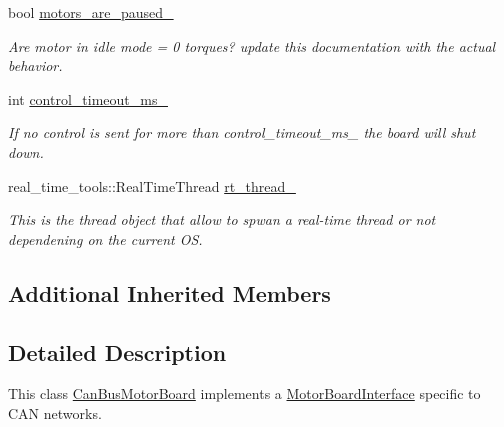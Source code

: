 \begin{DoxyCompactItemize}
\mbox{\label{classblmc__drivers_1_1CanBusMotorBoard_abdca3f76908ca197c4f12af814313a56}} 
bool \hyperlink{classblmc__drivers_1_1CanBusMotorBoard_abdca3f76908ca197c4f12af814313a56}{motors\+\_\+are\+\_\+paused\+\_\+}
\begin{DoxyCompactList}\small\item\em Are motor in idle mode = 0 torques?  update this documentation with the actual behavior. \end{DoxyCompactList}\item 
\mbox{\label{classblmc__drivers_1_1CanBusMotorBoard_a4f9605b0a147ecd1dde41a0fb7b45d47}} 
int \hyperlink{classblmc__drivers_1_1CanBusMotorBoard_a4f9605b0a147ecd1dde41a0fb7b45d47}{control\+\_\+timeout\+\_\+ms\+\_\+}
\begin{DoxyCompactList}\small\item\em If no control is sent for more than control\+\_\+timeout\+\_\+ms\+\_\+ the board will shut down. \end{DoxyCompactList}\item 
\mbox{\label{classblmc__drivers_1_1CanBusMotorBoard_a040b0b2f6c2691a54d82404f7a1badd6}} 
real\+\_\+time\+\_\+tools\+::\+Real\+Time\+Thread \hyperlink{classblmc__drivers_1_1CanBusMotorBoard_a040b0b2f6c2691a54d82404f7a1badd6}{rt\+\_\+thread\+\_\+}
\begin{DoxyCompactList}\small\item\em This is the thread object that allow to spwan a real-\/time thread or not dependening on the current OS. \end{DoxyCompactList}\end{DoxyCompactItemize}
\subsection*{Additional Inherited Members}


\subsection{Detailed Description}
This class \hyperlink{classblmc__drivers_1_1CanBusMotorBoard}{Can\+Bus\+Motor\+Board} implements a \hyperlink{classblmc__drivers_1_1MotorBoardInterface}{Motor\+Board\+Interface} specific to C\+AN networks. 

